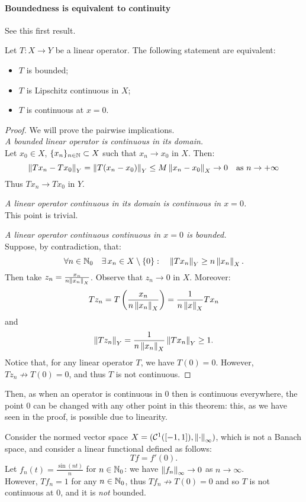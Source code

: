 \paragraph{Boundedness is equivalent to continuity} See this first result.
\begin{theo}
	Let $T:X\to Y$ be a linear operator. The following statement are equivalent:
	\begin{itemize}
		\item $T$ is bounded;
		\item $T$ is Lipschitz continuous in $X$;
		\item $T$ is continuous at $x=0$.
	\end{itemize}
\end{theo}
\begin{proof} We will prove the pairwise implications.\\
	\textit{A bounded linear operator is continuous in its domain.}\\
	Let $x_0\in X$, $\{x_n\}_{n\in \mathbb N} \subset X$ such that $x_n \to x_0$ in $X$. Then:
	$$
		\left\lVert Tx_n-Tx_0\right\rVert_Y
		=\left\lVert T(x_n-x_0)\right\rVert_Y 
		\leq M\left\lVert x_n-x_0\right\rVert_X 
		\to 0
	\quad \text{as } n \to +\infty$$
	Thus $T{x_n} \to Tx_0$ in $Y$.
	
	\textit{A linear operator continuous in its domain is continuous in $x=0$.}\\
	This point is trivial.
	
	\textit{A linear operator continuous continuous in $x=0$ is bounded.}\\
	Suppose, by contradiction, that:
	$$
	\forall n \in \mathbb N_0 \quad
	\exists\, x_n \in X \setminus \{0\} : \quad
	\left\lVert Tx_n\right\rVert_Y \geq n\left\lVert x_n\right\rVert_X.
	$$
	Then take $z_n = \frac{x_n}{n\left\lVert x_n\right\rVert_X}$. Observe that $z_n \to 0$ in $X$. Moreover:
	$$
	Tz_n 
	= T \left( \frac{x_n}{n\left\lVert x_n\right\rVert_X} \right)
	=\frac{1}{n\left\lVert x\right\rVert_X} Tx_n
	$$
	and
	$$
	\left\lVert Tz_n\right\rVert_Y 
	=\frac{1}{n\left\lVert x_n\right\rVert_X}\left\lVert Tx_n\right\rVert_Y
	\geq 1.
	$$
	Notice that, for any linear operator $T$, we have $T(0) = 0$. However, $Tz_n \not\to T(0) = 0$, and thus $T$ is not continuous.
\end{proof}
Then, as when an operator is continuous in $0$ then is continuous everywhere, the point $0$ can be changed with any other point in this theorem: this, as we have seen in the proof, is possible due to linearity.


\begin{exam}
	Consider the normed vector space $X=(\mathcal C^1([-1,1]),\left\lVert\cdot\right\rVert_\infty)$, which is not a Banach space, and consider a linear functional defined as follows:
	$$
		Tf 
		= f'(0)
		.
	$$
	Let $f_n(t) = \frac{\sin(nt)}{n}$ for $n \in \mathbb N_0$: we have $\left\lVert f_n\right\rVert_\infty \to 0$ as $n \to \infty$.\\
	However, $Tf_n=1$ for any $n \in \mathbb N_0$, thus $Tf_n \not \to T(0) = 0$ and so $T$ is not continuous at $0$, and it is \textit{not} bounded.
\end{exam}

